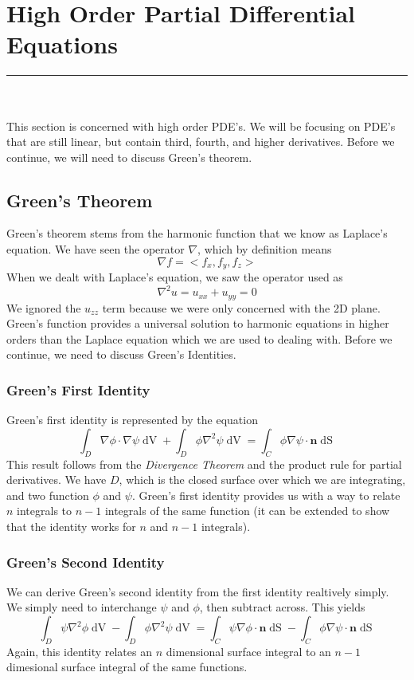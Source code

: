 \section{High Order Partial Differential Equations}
\hrule
\noindent \\\\
This section is concerned with high order PDE's. We will be focusing on PDE's that are still linear,
but contain third, fourth, and higher derivatives. Before we continue, we will need to discuss Green's
theorem.

\subsection{Green's Theorem}
Green's theorem stems from the harmonic function that we know as Laplace's equation. We have seen the
operator $\nabla$, which by definition means
\[
\nabla f = <f_{x},f_{y},f_{z}>
\]
When we dealt with Laplace's equation, we saw the operator used as
\[
\nabla^{2}u = u_{xx} + u_{yy} = 0
\]
We ignored the $u_{zz}$ term because we were only concerned with the 2D plane. Green's function provides
a universal solution to harmonic equations in higher orders than the Laplace equation which we are used to
dealing with. Before we continue, we need to discuss Green's Identities.
\subsubsection{Green's First Identity}
Green's first identity is represented by the equation
\[
\int_{D}\nabla\phi\cdot\nabla\psi\mathop{dV} + \int_{D}\phi\nabla^{2}\psi\mathop{dV} =
\int_{C}\phi\nabla\psi\cdot\mathbf{n}\mathop{dS}
\]
This result follows from the \textit{Divergence Theorem} and the product rule for partial derivatives.
We have $D$, which is the closed surface over which we are integrating, and two function $\phi$ and
$\psi$. Green's first identity provides us with a way to relate $n$ integrals to $n - 1$ integrals of the
same function (it can be extended to show that the identity works for $n$ and $n-1$ integrals).
\subsubsection{Green's Second Identity}
We can derive Green's second identity from the first identity realtively simply. We simply need to
interchange $\psi$ and $\phi$, then subtract across. This yields
\[
\int_{D} \psi\nabla^{2}\phi\mathop{dV} - \int_{D}\phi\nabla^{2}\psi\mathop{dV} =
\int_{C}\psi\nabla\phi\cdot\mathbf{n}\mathop{dS} - \int_{C}\phi\nabla\psi\cdot\mathbf{n}\mathop{dS}
\]
Again, this identity relates an $n$ dimensional surface integral to an $n-1$ dimesional surface integral
of the same functions.
